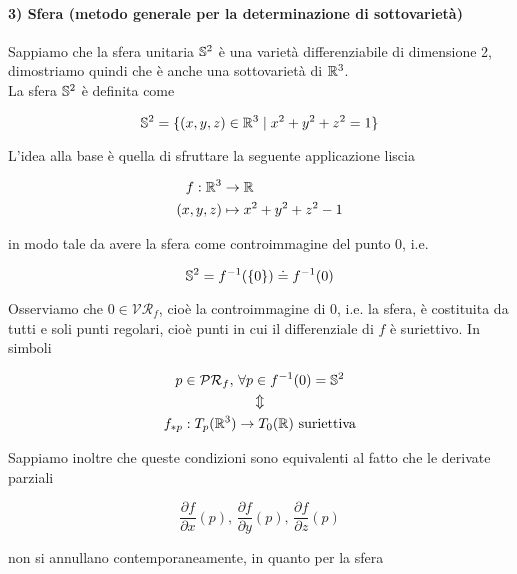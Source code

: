 \paragraph{3) Sfera (metodo generale per la determinazione di sottovarietà)}

Sappiamo che la sfera unitaria $ \S^{2} $ è una varietà differenziabile di dimensione 2, dimostriamo quindi che è anche una sottovarietà di $ \R^{3} $.\\
La sfera $ \S^{2} $ è definita come

\begin{equation}
	\S^{2} = \{ (x,y,z) \in \R^{3} \mid x^{2} + y^{2} + z^{2} = 1 \}
\end{equation}

L'idea alla base è quella di sfruttare la seguente applicazione liscia

\begin{align}
	\begin{split}
		f : \R^{3} &\to \R\\
		(x,y,z) &\mapsto x^{2} + y^{2} + z^{2} - 1
	\end{split}
\end{align}

in modo tale da avere la sfera come controimmagine del punto 0, i.e.

\begin{equation}
\S^{2} = f^{-1}(\{0\}) \doteq f^{-1}(0)
\end{equation}

Osserviamo che $ 0 \in \mathcal{VR}_{f} $, cioè la controimmagine di 0, i.e. la sfera, è costituita da tutti e soli punti regolari, cioè punti in cui il differenziale di $ f $ è suriettivo. In simboli

\begin{gather}
	p \in \mathcal{PR}_{f}, \, \forall p \in f^{-1}(0) = \S^{2}\nonumber\\
	\Updownarrow\\
	f_{*p} : T_{p}(\R^{3}) \to T_{0}(\R) \text{ suriettiva}\nonumber
\end{gather}

Sappiamo inoltre che queste condizioni sono equivalenti al fatto che le derivate parziali

\begin{equation}
	\dfrac{\partial f}{\partial x} (p), \, \dfrac{\partial f}{\partial y} (p), \, \dfrac{\partial f}{\partial z} (p)
\end{equation}

non si annullano contemporaneamente, in quanto per la sfera


